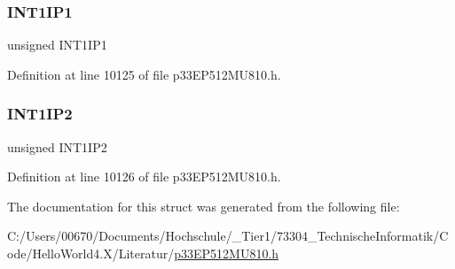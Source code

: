 \subsubsection{\texorpdfstring{I\+N\+T1\+I\+P1}{INT1IP1}}
{\footnotesize\ttfamily unsigned I\+N\+T1\+I\+P1}



Definition at line 10125 of file p33\+E\+P512\+M\+U810.\+h.

\mbox{\label{structtag_i_p_c5_b_i_t_s_ad96bd04af07069a1527ed6a08b2150b8}} 
\subsubsection{\texorpdfstring{I\+N\+T1\+I\+P2}{INT1IP2}}
{\footnotesize\ttfamily unsigned I\+N\+T1\+I\+P2}



Definition at line 10126 of file p33\+E\+P512\+M\+U810.\+h.



The documentation for this struct was generated from the following file\+:\begin{DoxyCompactItemize}
\item 
C\+:/\+Users/00670/\+Documents/\+Hochschule/\+\_\+\+Tier1/73304\+\_\+\+Technische\+Informatik/\+Code/\+Hello\+World4.\+X/\+Literatur/\hyperlink{p33_e_p512_m_u810_8h}{p33\+E\+P512\+M\+U810.\+h}\end{DoxyCompactItemize}
